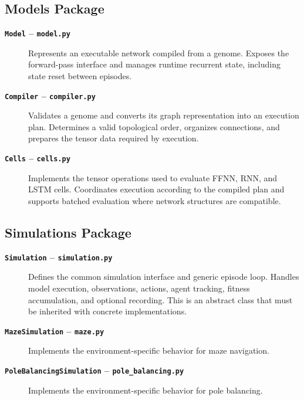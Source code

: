 \documentclass[11pt]{article}
\begin{document}
\subsection{Models Package}

\begin{description}

    \item[\textbf{\texttt{Model} -- \texttt{model.py}}]
    \hspace{1em}Represents an executable network compiled from a genome.
    Exposes the forward-pass interface and manages runtime recurrent
    state, including state reset between episodes.

    \item[\textbf{\texttt{Compiler} -- \texttt{compiler.py}}]
    \hspace{1em}Validates a genome and converts its graph representation
    into an execution plan. Determines a valid topological order,
    organizes connections, and prepares the tensor data required by
    execution.

    \item[\textbf{\texttt{Cells} -- \texttt{cells.py}}]
    \hspace{1em}Implements the tensor operations used to evaluate FFNN,
    RNN, and LSTM cells. Coordinates execution according to the
    compiled plan and supports batched evaluation where network
    structures are compatible.

\end{description}

\subsection{Simulations Package}

\begin{description}

    \item[\textbf{\texttt{Simulation} -- \texttt{simulation.py}}]
    \hspace{1em}Defines the common simulation interface and generic
    episode loop. Handles model execution, observations, actions,
    agent tracking, fitness accumulation, and optional recording. This is an abstract class that must be inherited with concrete implementations.

    \item[\textbf{\texttt{MazeSimulation} -- \texttt{maze.py}}]
    \hspace{1em}Implements the environment-specific behavior for maze
    navigation.

    \item[\textbf{\texttt{PoleBalancingSimulation} -- \texttt{pole\_balancing.py}}]
    \hspace{1em}Implements the environment-specific behavior for pole
    balancing.

\end{description}
\end{document}
